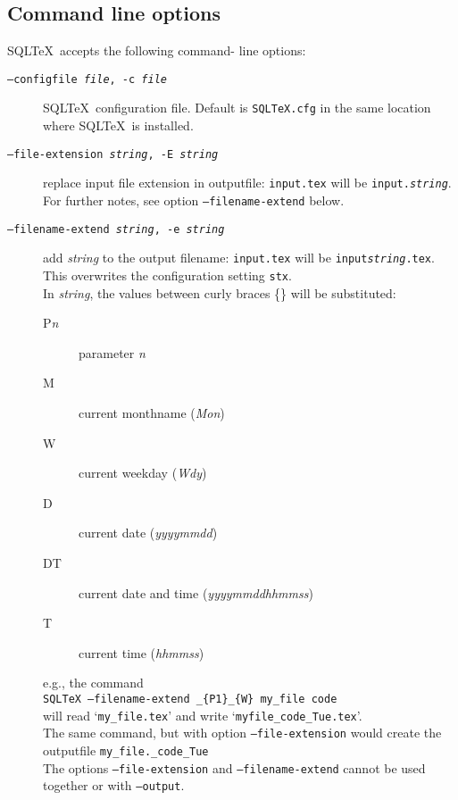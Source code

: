\documentclass{article}
\begin{document}
\subsection{Command line options}\label{cmdline}

SQL\TeX\ accepts the following command- line options:

\begin{description}
\item[\texttt{--configfile \textit{file}, -c \textit{file}}] SQL\TeX\ configuration file. Default is \texttt{SQLTeX.cfg}
in the same location where SQL\TeX\ is installed.

\item[\texttt{--file-extension \textit{string}, -E \textit{string}}] replace input file extension in outputfile:
\texttt{input.tex} will be \texttt{input.\textit{string}}. \\
For further notes, see option \texttt{--filename-extend} below.

\item[\texttt{--filename-extend \textit{string}, -e \textit{string}}] add \textit{string} to the output filename:
\texttt{input.tex} will be \texttt{input\textit{string}.tex}. This overwrites
the configuration setting \texttt{stx}. \\
In \textit{string}, the values between curly braces \{\} will be substituted:
\begin{description}
\item[P\textit{n}] parameter \textit{n}
\item[M] current monthname (\textit{Mon})
\item[W] current weekday (\textit{Wdy})
\item[D] current date (\textit{yyyymmdd})
\item[DT] current date and time (\textit{yyyymmddhhmmss})
\item[T] current time (\textit{hhmmss})
\end{description}
e.g., the command\\
\hspace*{1em}\texttt{SQLTeX --filename-extend \_\{P1\}\_\{W\} my\_file code}\\
will read `\texttt{my\_file.tex}' and write `\texttt{myfile\_code\_Tue.tex}'.\\
The same command, but with option \texttt{---file-extension} would create the outputfile \texttt{my\_file.\_code\_Tue}\\
The options \texttt{--file-extension} and \texttt{--filename-extend} cannot be used together or with \texttt{--output}.


\end{description}
\end{document}
